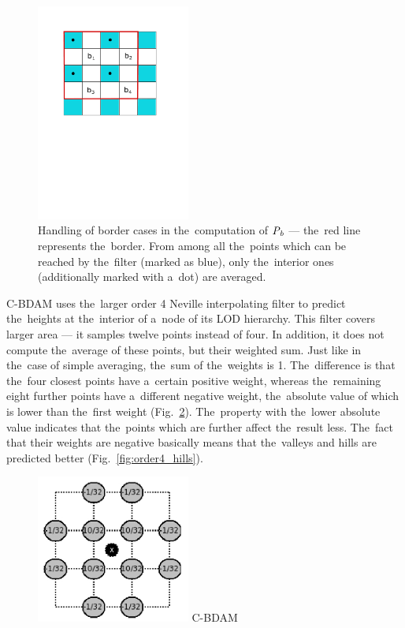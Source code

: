 \begin{figure}
	\includegraphics[trim={1cm 14cm 2cm 0}, clip, width=0.45\textwidth]{figures/bborders.pdf}\centering
	\caption{Handling of border cases in the~computation of $\mathit{P_{b}}$ --- the~red line represents the~border. From among all the~points which can be reached by the~filter (marked as blue), only the~interior ones (additionally marked with a~dot) are averaged.}
	\label{fig:bborders}
\end{figure}


C-BDAM uses the~larger order 4 Neville interpolating filter to predict the~heights at the~interior of a~node of its LOD hierarchy. This filter covers larger area --- it samples twelve points instead of four. In addition, it does not compute the~average of these points, but their weighted sum. Just like in the~case of simple averaging, the~sum of the~weights is 1. The~difference is that the~four closest points have a~certain positive weight, whereas the~remaining eight further points have a~different negative weight, the~absolute value of which is lower than the~first weight (Fig.~\ref{fig:order4}). The~property with the~lower absolute value indicates that the~points which are further affect the~result less. The~fact that their weights are negative basically means that the~valleys and hills are predicted better (Fig.~\ref{fig:order4_hills}). 

\begin{figure}
	\includegraphics[width=0.45\textwidth]{figures/order4.png}\centering
	{C-BDAM~\cite{cbdam}}
	\label{fig:order4}
\end{figure}

